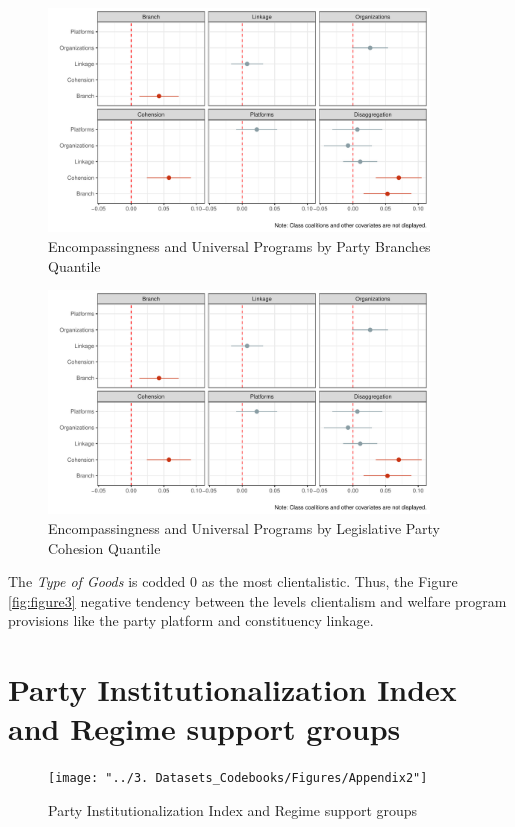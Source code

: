 \documentclass[12pt]{article}
\begin{document}
\begin{figure}[!ht]
	\centering
	\includegraphics[width=0.9\textwidth]{"../3. Datasets_Codebooks/Figures/Plot4"}
	\caption{Encompassingness and Universal Programs by Party Branches Quantile}
	\label{fig:figure4}
\end{figure}

\begin{figure}[!ht]
	\centering
	\includegraphics[width=0.9\textwidth]{"../3. Datasets_Codebooks/Figures/Plot4"}
	\caption{Encompassingness and Universal Programs by Legislative Party Cohesion Quantile}
	\label{fig:figure5}
\end{figure}


The \textit{Type of Goods} is codded 0 as the most clientalistic. Thus, the Figure \ref{fig:figure3} negative tendency between the levels clientalism and welfare program provisions like the party platform and constituency linkage.

\section{Party Institutionalization Index and Regime support groups}
\begin{figure}[!htbt]
	\centering
	\texttt{[image: "../3. Datasets\_Codebooks/Figures/Appendix2"]}
	\caption{Party Institutionalization Index and Regime support groups}
	\label{fig:appendix2}
\end{figure}
\end{document}
